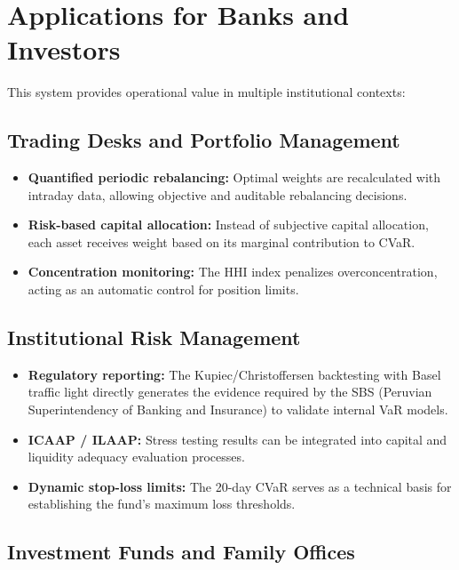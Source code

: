 \documentclass[11pt,a4paper]{article}
\begin{document}
\section{Applications for Banks and Investors}

This system provides operational value in multiple institutional contexts:

\subsection{Trading Desks and Portfolio Management}

\begin{itemize}[leftmargin=*]
    \item \textbf{Quantified periodic rebalancing:} Optimal weights are recalculated with
    intraday data, allowing objective and auditable rebalancing decisions.
    \item \textbf{Risk-based capital allocation:} Instead of subjective capital allocation,
    each asset receives weight based on its marginal contribution to CVaR.
    \item \textbf{Concentration monitoring:} The HHI index penalizes overconcentration,
    acting as an automatic control for position limits.
\end{itemize}

\subsection{Institutional Risk Management}

\begin{itemize}[leftmargin=*]
    \item \textbf{Regulatory reporting:} The Kupiec/Christoffersen backtesting with Basel
    traffic light directly generates the evidence required by the SBS (Peruvian Superintendency of Banking and Insurance) to validate internal VaR models.
    \item \textbf{ICAAP / ILAAP:} Stress testing results can be integrated into
    capital and liquidity adequacy evaluation processes.
    \item \textbf{Dynamic stop-loss limits:} The 20-day CVaR serves as a technical basis
    for establishing the fund's maximum loss thresholds.
\end{itemize}

\subsection{Investment Funds and Family Offices}
\end{document}
